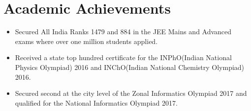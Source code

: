 \documentclass[a4paper,10pt]{article}
\begin{document}

\section{Academic Achievements}
\small
\begin{itemize}
\item Secured All India Ranks 1479 and 884 in the JEE Mains and Advanced exams where over one million students applied.
\item Received a state top hundred certificate for the INPhO(Indian National Physics Olympiad) 2016 and INChO(Indian National Chemistry Olympiad) 2016.
\item Secured second at the city level of the Zonal Informatics Olympiad 2017 and qualified for the National Informatics Olympiad 2017.
\end{itemize}
\end{document}
